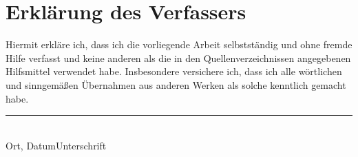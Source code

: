 \vspace*{\fill}


\section{Erklärung des Verfassers}


\begin{small}

    Hiermit erkläre ich, dass ich die vorliegende Arbeit selbstständig und ohne fremde Hilfe verfasst und keine anderen als die in den Quellenverzeichnissen angegebenen Hilfsmittel verwendet habe. Insbesondere versichere ich, dass ich alle wörtlichen und sinngemäßen Übernahmen aus anderen Werken als solche kenntlich gemacht habe.

    \vspace{2\baselineskip}
    \noindent
    \rule[0.5ex]{25em}{0.5pt}\\
    Ort, Datum\qquad\qquad\qquad\qquad Unterschrift

\end{small}
